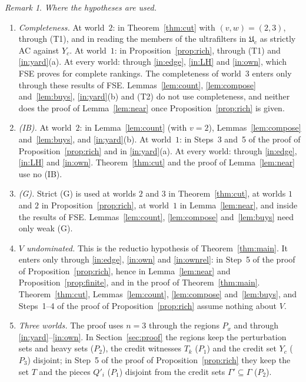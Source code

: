 \documentclass[11pt]{article}
\theoremstyle{definition}\newtheorem{definition}[theorem]{Definition}
\theoremstyle{remark}\newtheorem{remark}[theorem]{Remark}
\newcommand{\UU}{\mathfrak U}
\begin{document}
\begin{remark}\label{rem:hyp}
\emph{Where the hypotheses are used.}
\begin{enumerate}[label=(\alph*),leftmargin=*,itemsep=2pt]
\item \emph{Completeness.} At world~$2$: in Theorem~\ref{thm:cut} with
$(v,w)=(2,3)$, through (T1), and in reading the members of the
ultrafilters in $\UU_c$ as strictly AC against $Y_c$. At world~$1$: in
Proposition~\ref{prop:rich}, through (T1) and \ref{in:yard}(a). At every
world: through \ref{in:edge}, \ref{in:LH} and \ref{in:own}, which FSE proves
for complete rankings. The completeness of world~$3$ enters only through
these results of FSE. Lemmas~\ref{lem:count}, \ref{lem:compose}
and~\ref{lem:buys}, \ref{in:yard}(b) and (T2) do not use completeness, and
neither does the proof of Lemma~\ref{lem:near} once
Proposition~\ref{prop:rich} is given.
\item \emph{(IB).} At world~$2$: in Lemma~\ref{lem:count} (with $v=2$),
Lemmas~\ref{lem:compose} and~\ref{lem:buys}, and \ref{in:yard}(b). At
world~$1$: in Steps~3 and~5 of the proof of Proposition~\ref{prop:rich} and
in \ref{in:yard}(a). At every world: through \ref{in:edge}, \ref{in:LH} and
\ref{in:own}. Theorem~\ref{thm:cut} and the proof of Lemma~\ref{lem:near}
use no (IB).
\item \emph{(G).} Strict (G) is used at worlds $2$ and $3$ in
Theorem~\ref{thm:cut}, at worlds $1$ and $2$ in
Proposition~\ref{prop:rich}, at world~$1$ in Lemma~\ref{lem:near}, and
inside the results of FSE. Lemmas~\ref{lem:count}, \ref{lem:compose}
and~\ref{lem:buys} need only weak (G).
\item \emph{$V$ undominated.} This is the reductio hypothesis of
Theorem~\ref{thm:main}. It enters only through \ref{in:edge}, \ref{in:own}
and \ref{in:ownrel}: in Step~5 of the proof of Proposition~\ref{prop:rich},
hence in Lemma~\ref{lem:near} and Proposition~\ref{prop:finite}, and in the
proof of Theorem~\ref{thm:main}. Theorem~\ref{thm:cut},
Lemmas~\ref{lem:count}, \ref{lem:compose} and~\ref{lem:buys}, and Steps~1--4
of the proof of Proposition~\ref{prop:rich} assume nothing about $V$.
\item \emph{Three worlds.} The proof uses $n=3$ through the regions $P_x$
and through \ref{in:yard}--\ref{in:own}. In Section~\ref{sec:proof} the
regions keep the perturbation sets and heavy sets ($P_2$), the credit
witnesses $T_k$ ($P_1$) and the credit set $Y_c$ ($P_3$) disjoint; in Step~5
of the proof of Proposition~\ref{prop:rich} they keep the set $T$ and the
pieces $Q'_i$ ($P_1$) disjoint from the credit sets $\Gamma'\subseteq\Gamma$
($P_2$).
\end{enumerate}
\end{remark}
\end{document}
